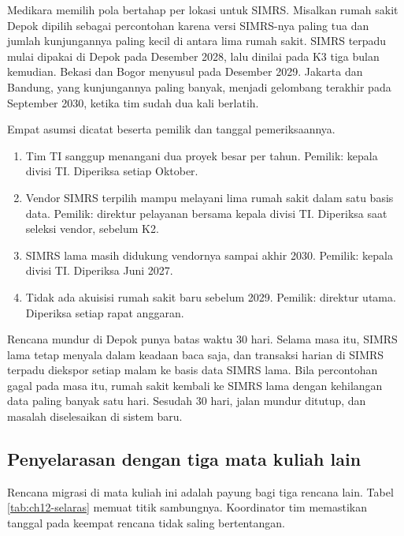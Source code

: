 \begin{kasus}[title={Kasus Medikara Health: Rencana Migrasi SIMRS}]
  Medikara memilih pola bertahap per lokasi untuk SIMRS. Misalkan rumah sakit
  Depok dipilih sebagai percontohan karena versi SIMRS-nya paling tua dan jumlah
  kunjungannya paling kecil di antara lima rumah sakit. SIMRS terpadu mulai
  dipakai di Depok pada Desember 2028, lalu dinilai pada K3 tiga bulan
  kemudian. Bekasi dan Bogor menyusul pada Desember 2029. Jakarta dan Bandung,
  yang kunjungannya paling banyak, menjadi gelombang terakhir pada September
  2030, ketika tim sudah dua kali berlatih.

  Empat asumsi dicatat beserta pemilik dan tanggal pemeriksaannya.
  \begin{enumerate}
    \item[A1.] Tim TI sanggup menangani dua proyek besar per tahun. Pemilik:
          kepala divisi TI. Diperiksa setiap Oktober.
    \item[A2.] Vendor SIMRS terpilih mampu melayani lima rumah sakit dalam satu
          basis data. Pemilik: direktur pelayanan bersama kepala divisi TI.
          Diperiksa saat seleksi vendor, sebelum K2.
    \item[A3.] SIMRS lama masih didukung vendornya sampai akhir 2030. Pemilik:
          kepala divisi TI. Diperiksa Juni 2027.
    \item[A4.] Tidak ada akuisisi rumah sakit baru sebelum 2029. Pemilik:
          direktur utama. Diperiksa setiap rapat anggaran.
  \end{enumerate}

  Rencana mundur di Depok punya batas waktu 30 hari. Selama masa itu, SIMRS
  lama tetap menyala dalam keadaan baca saja, dan transaksi harian di SIMRS
  terpadu diekspor setiap malam ke basis data SIMRS lama. Bila percontohan gagal
  pada masa itu, rumah sakit kembali ke SIMRS lama dengan kehilangan data
  paling banyak satu hari. Sesudah 30 hari, jalan mundur ditutup, dan masalah
  diselesaikan di sistem baru.
\end{kasus}

\subsection*{Penyelarasan dengan tiga mata kuliah lain}

Rencana migrasi di mata kuliah ini adalah payung bagi tiga rencana lain.
Tabel \ref{tab:ch12-selaras} memuat titik sambungnya. Koordinator tim
memastikan tanggal pada keempat rencana tidak saling bertentangan.

